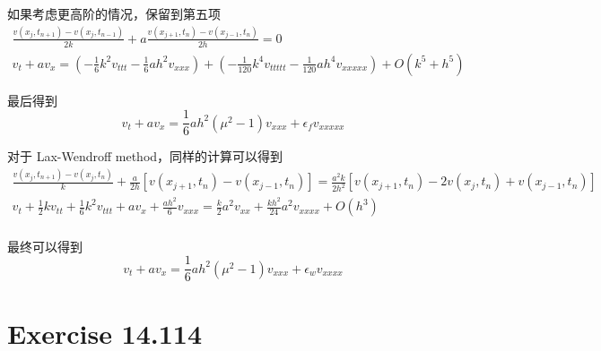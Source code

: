 \documentclass[a4paper]{article}
\begin{document}
\par 如果考虑更高阶的情况，保留到第五项
\begin{equation}
    \begin{gathered}  
        \frac{v(x_j, t_{n+1})-v(x_j, t_{n-1})}{2k} + a\frac{v(x_{j+1}, t_n)-v(x_{j-1}, t_n)}{2h}=0\\
        v_t + av_x = 
        \left(-\frac{1}{6}k^2v_{ttt}-\frac{1}{6}ah^2v_{xxx}\right)
        +\left(-\frac{1}{120}k^4v_{ttttt}-\frac{1}{120}ah^4v_{xxxxx}\right)
        +O(k^5+h^5)
    \end{gathered}
\end{equation}
\par 最后得到
\begin{equation}
    v_t + av_x = \frac{1}{6}ah^2(\mu^2-1)v_{xxx} + \epsilon_f v_{xxxxx}
\end{equation}
\par 对于 Lax-Wendroff method，同样的计算可以得到
\begin{equation}
    \begin{gathered}  
        \frac{v(x_j,t_{n+1})-v(x_j,t_{n})}{k}
        +\frac{a}{2h}\left[
            v(x_{j+1},t_{n})-v(x_{j-1},t_{n})
        \right]=
        \frac{a^2k}{2h^2}\left[
            v(x_{j+1},t_{n})-2v(x_{j},t_{n})+v(x_{j-1},t_{n})
        \right]\\
        v_t+\frac{1}{2}kv_{tt} + \frac{1}{6}k^2v_{ttt}
        +av_x+\frac{ah^2}{6}v_{xxx}
        =\frac{k}{2}a^2v_{xx}
        +\frac{kh^2}{24}a^2v_{xxxx}+ O(h^3)\\
    \end{gathered}
\end{equation}
\par 最终可以得到
\begin{equation}
    v_t + av_x = \frac{1}{6}ah^2(\mu^2-1)v_{xxx} + \epsilon_w v_{xxxx}
\end{equation}

\section*{Exercise 14.114}
    
\end{document}
